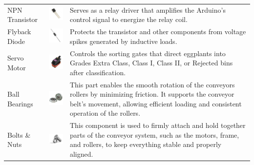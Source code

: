 {\begin{longtable}{
		>{\centering\arraybackslash}m{3cm}  
		>{\centering\arraybackslash}m{4cm} 
		>{\arraybackslash}m{6cm}
	}
	NPN Transistor & \includegraphics[width=3cm]{figures/transistor} &
	Serves as a relay driver that amplifies the Arduino’s control signal to energize the relay coil. \\
	
	Flyback Diode & \includegraphics[width=3cm]{figures/diode} &
	Protects the transistor and other components from voltage spikes generated by inductive loads. \\
	
	Servo Motor & \includegraphics[width=3cm]{figures/servo_motor} &
	Controls the sorting gates that direct eggplants into Grades Extra Class, Class I, Class II, or Rejected bins after classification. \\
	
	Ball Bearings & \includegraphics[width=3cm]{figures/ball_bearing} &
	This part enables the smooth rotation of the conveyors rollers by minimizing friction. It supports the conveyor belt’s movement, allowing efficient loading and consistent operation of the rollers. \\
	
	Bolts \& Nuts & \includegraphics[width=3cm]{figures/bolts_nuts} &
	This component is used to firmly attach and hold together parts of the conveyor system, such as the motors, frame, and rollers, to keep everything stable and properly aligned. \\
	

\end{longtable}}
